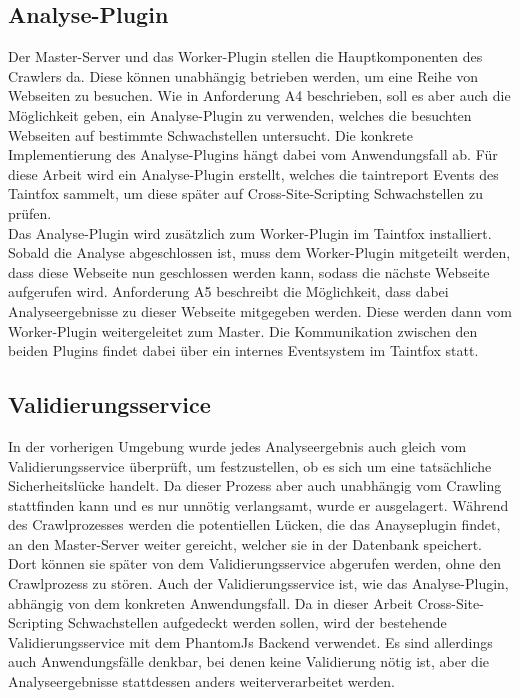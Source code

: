 \subsection{Analyse-Plugin}
Der Master-Server und das Worker-Plugin stellen die Hauptkomponenten des Crawlers da. Diese können unabhängig betrieben werden, um eine Reihe von Webseiten zu besuchen. Wie in Anforderung A4 beschrieben, soll es aber auch die Möglichkeit geben, ein Analyse-Plugin zu verwenden, welches die besuchten Webseiten auf bestimmte Schwachstellen untersucht. Die konkrete Implementierung des Analyse-Plugins hängt dabei vom Anwendungsfall ab. Für diese Arbeit wird ein Analyse-Plugin erstellt, welches die taintreport Events des Taintfox sammelt, um diese später auf Cross-Site-Scripting Schwachstellen zu prüfen. \\
Das Analyse-Plugin wird zusätzlich zum Worker-Plugin im Taintfox installiert. Sobald die Analyse abgeschlossen ist, muss dem Worker-Plugin mitgeteilt werden, dass diese Webseite nun geschlossen werden kann, sodass die nächste Webseite aufgerufen wird. Anforderung A5 beschreibt die Möglichkeit, dass dabei Analyseergebnisse zu dieser Webseite mitgegeben werden. Diese werden dann vom Worker-Plugin weitergeleitet zum Master. Die Kommunikation zwischen den beiden Plugins findet dabei über ein internes Eventsystem im Taintfox statt.\\
\subsection{Validierungsservice}
In der vorherigen Umgebung wurde jedes Analyseergebnis auch gleich vom Validierungsservice überprüft, um festzustellen, ob es sich um eine tatsächliche Sicherheitslücke handelt. Da dieser Prozess aber auch unabhängig vom Crawling stattfinden kann und es nur unnötig verlangsamt, wurde er ausgelagert. Während des Crawlprozesses werden die potentiellen Lücken, die das Anayseplugin findet, an den Master-Server weiter gereicht, welcher sie in der Datenbank speichert. Dort können sie später von dem Validierungsservice abgerufen werden, ohne den Crawlprozess zu stören. Auch der Validierungsservice ist, wie das Analyse-Plugin, abhängig von dem konkreten Anwendungsfall. Da in dieser Arbeit Cross-Site-Scripting Schwachstellen aufgedeckt werden sollen, wird der bestehende Validierungsservice mit dem PhantomJs Backend verwendet. Es sind allerdings auch Anwendungsfälle denkbar, bei denen keine Validierung nötig ist, aber die Analyseergebnisse stattdessen anders weiterverarbeitet werden.

